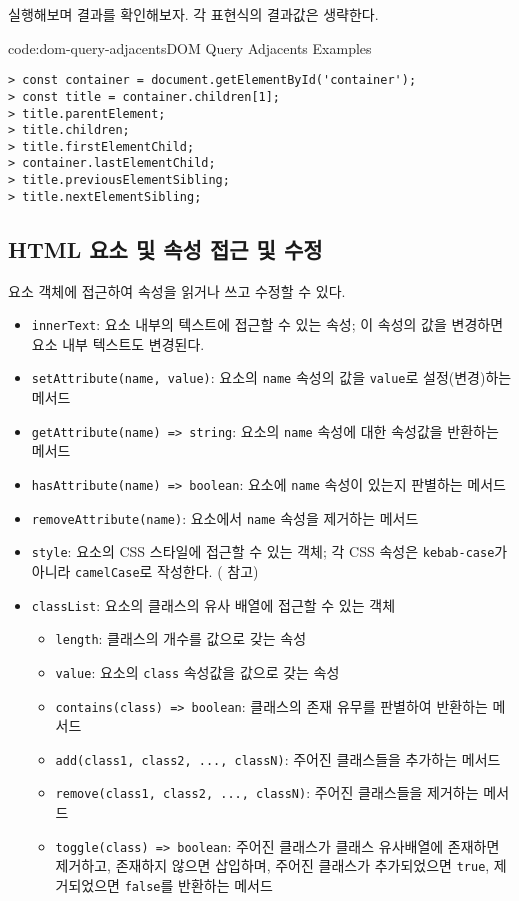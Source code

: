 \를 실행해보며 결과를 확인해보자. 각 표현식의 결과값은 생략한다.

\begin{codeenv}{code:dom-query-adjacents}{DOM Query Adjacents Examples}\begin{verbatim}
> const container = document.getElementById('container');
> const title = container.children[1];
> title.parentElement;
> title.children;
> title.firstElementChild;
> container.lastElementChild;
> title.previousElementSibling;
> title.nextElementSibling;
\end{verbatim}
\end{codeenv}

\subsection*{HTML 요소 및 속성 접근 및 수정}

요소 객체에 접근하여 속성을 읽거나 쓰고 수정할 수 있다.

\begin{itemize}
    \item \texttt{innerText}: 요소 내부의 텍스트에 접근할 수 있는 속성; 이 속성의 값을 변경하면 요소 내부 텍스트도 변경된다.
    \item \texttt{setAttribute(name, value)}: 요소의 \texttt{name} 속성의 값을 \texttt{value}로 설정(변경)하는 메서드
    \item \texttt{getAttribute(name) => string}: 요소의 \texttt{name} 속성에 대한 속성값을 반환하는 메서드
    \item \texttt{hasAttribute(name) => boolean}: 요소에 \texttt{name} 속성이 있는지 판별하는 메서드
    \item \texttt{removeAttribute(name)}: 요소에서 \texttt{name} 속성을 제거하는 메서드
    \item \texttt{style}: 요소의 CSS 스타일에 접근할 수 있는 객체; 각 CSS 속성은 \texttt{kebab-case}가 아니라 \texttt{camelCase}로 작성한다. ( 참고)
    \newpage
    \item \texttt{classList}: 요소의 클래스의 유사 배열에 접근할 수 있는 객체
    \begin{itemize}
      \item \texttt{length}: 클래스의 개수를 값으로 갖는 속성
      \item \texttt{value}: 요소의 \texttt{class} 속성값을 값으로 갖는 속성
      \item \texttt{contains(class) => boolean}: 클래스의 존재 유무를 판별하여 반환하는 메서드
      \item \texttt{add(class1, class2, ..., classN)}: 주어진 클래스들을 추가하는 메서드
      \item \texttt{remove(class1, class2, ..., classN)}: 주어진 클래스들을 제거하는 메서드
      \item \texttt{toggle(class) => boolean}: 주어진 클래스가 클래스 유사배열에 존재하면 제거하고, 존재하지 않으면 삽입하며, 주어진 클래스가 추가되었으면 \texttt{true}, 제거되었으면 \texttt{false}를 반환하는 메서드
    \end{itemize}
\end{itemize}

